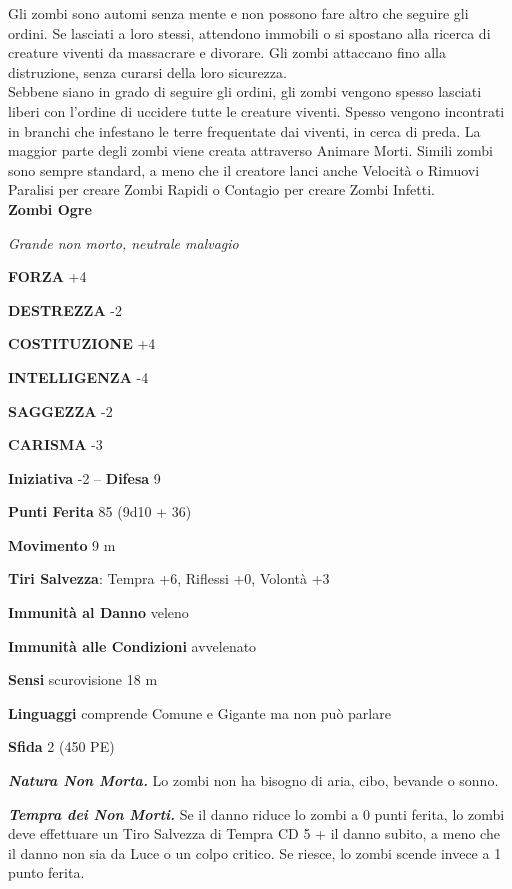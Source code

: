 \begin{multicols}{2}
Gli zombi sono automi senza mente e non possono fare altro che seguire gli ordini. Se lasciati a loro stessi, attendono immobili o si spostano alla ricerca di creature viventi da massacrare e divorare. Gli zombi attaccano fino alla distruzione, senza curarsi della loro sicurezza.\\

Sebbene siano in grado di seguire gli ordini, gli zombi vengono spesso lasciati liberi con l'ordine di uccidere tutte le creature viventi. Spesso vengono incontrati in branchi che infestano le terre frequentate dai viventi, in cerca di preda. La maggior parte degli zombi viene creata attraverso Animare Morti. Simili zombi sono sempre standard, a meno che il creatore lanci anche Velocità o Rimuovi Paralisi per creare Zombi Rapidi o Contagio per creare Zombi Infetti.\\


\medskip{}\textbf{Zombi Ogre}

\emph{Grande non morto, neutrale malvagio}

\textbf{FORZA} +4

\textbf{DESTREZZA} -2

\textbf{COSTITUZIONE} +4

\textbf{INTELLIGENZA} -4

\textbf{SAGGEZZA} -2

\textbf{CARISMA} -3

\textbf{Iniziativa} -2 -- \textbf{Difesa} 9

\textbf{Punti Ferita} 85 (9d10 + 36)

\textbf{Movimento} 9 m

\textbf{Tiri Salvezza}: Tempra +6, Riflessi +0, Volontà +3

\textbf{Immunità al Danno} veleno

\textbf{Immunità alle Condizioni} avvelenato

\textbf{Sensi} scurovisione 18 m

\textbf{Linguaggi} comprende Comune e Gigante ma non può parlare

\textbf{Sfida} 2 (450 PE)

\emph{\textbf{Natura Non Morta.}} Lo zombi non ha bisogno di aria, cibo, bevande o sonno.

\emph{\textbf{Tempra dei Non Morti.}} Se il danno riduce lo zombi a 0 punti ferita, lo zombi deve effettuare un Tiro Salvezza di Tempra CD 5 + il danno subito, a meno che il danno non sia da Luce o un colpo critico. Se riesce, lo zombi scende invece a 1 punto ferita.


\end{multicols}
